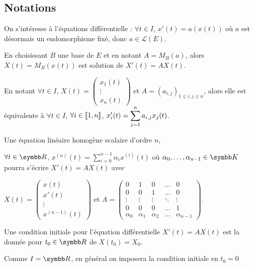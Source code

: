 \subsection{Notations}

On s'intéresse à l'équations différentielle : $\forall t \in I$, $x'(t) = a(x(t))$
où $a$ est désormais un endomorphisme fixé, donc $a \in \mathscr L(E)$.

En choisissant $B$ une base de $E$ et en notant $A = M_B(a)$, 
alors $X(t) = M_B(x(t))$ est solution de $X'(t) = A X(t)$.

En notant $\forall t \in I$, $X(t) = \begin{pmatrix}
    x_1(t) \\ \vdots \\ x_n(t)
\end{pmatrix}$ et $A = (a_{i, j})_{1 \leqslant i, j \leqslant n}$, alors elle est équivalente 
à $\forall t \in I$, $\forall i \in [\![1, n]\!]$, $\displaystyle x'_i(t) = \sum_{j = 1}^{n} a_{i, j} x_j(t)$.

\begin{remarque}
    Une équation linéaire homogène scalaire d'ordre $n$, 

    $\forall t \in \R$, $x^{(n)}(t) = \sum_{i = 0}^{n - 1} \alpha_i x^{(i)}(t)$ 
    où $\alpha_0, \dots, \alpha_{n - 1} \in \K$ pourra s'écrire 
    $X'(t) = AX(t)$ avec 
    
    $X(t) = \begin{pmatrix}
    x(t) \\ x'(t) \\ \vdots \\ x^{(n - 1)}(t)
    \end{pmatrix}$ et $A = \begin{pmatrix}
    0 & 1 & 0 & \dots & 0 \\
    0 & 0 & 1 & \dots & 0 \\
    \vdots & \vdots & \vdots & \ddots & \vdots \\
    0 & 0 & 0 & \dots & 1 \\
    \alpha_0 & \alpha_1 & \alpha_2 & \dots & \alpha_{n - 1}
    \end{pmatrix}$.
\end{remarque}

\begin{remarque}
    Une condition initiale pour l'équation différentielle $X'(t) = A X(t)$ est 
    la donnée pour $t_0 \in \R$ de $X(t_0) = X_0$. 

    Comme $I = \R$, en général on imposera la condition initiale en $t_0 = 0$
\end{remarque}

